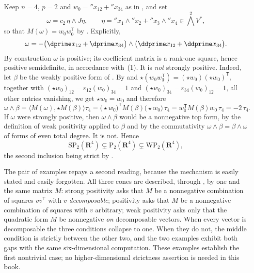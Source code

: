 \begin{example}
\label{ex:ch09-positive-not-strong}
Keep $n=4$, $p=2$ and $w_0=\dprime x_{12}+\dprime x_{34}$ as in
, and set
\[
 \omega=c_2\,\eta\wedge J\eta,
 \qquad
 \eta=\dprime x_1\wedge\dprime x_2+\dprime x_3\wedge\dprime x_4
     \in\bigwedge^2V^*,
\]
so that $M(\omega)=w_0w_0^{\mathsf T}$ by .
Explicitly,
\[
 \omega=-\bigl(\dprime x_{12}+\dprime x_{34}\bigr)
        \wedge\bigl(\ddprime x_{12}+\ddprime x_{34}\bigr).
\]
By construction $\omega$ is positive; its coefficient matrix is a rank-one
square, hence positive semidefinite, in accordance with
\,(1).  It is \emph{not} strongly
positive.  Indeed, let $\beta$ be the weakly positive form of
.  By
 and
$\star(w_0w_0^{\mathsf T})=(\star w_0)(\star w_0)^{\mathsf T}$, together with
$(\star w_0)_{12}=\varepsilon_{12}(w_0)_{34}=1$ and
$(\star w_0)_{34}=\varepsilon_{34}(w_0)_{12}=1$, all other entries vanishing,
we get $\star w_0=w_0$ and therefore
\[
 \omega\wedge\beta
 =\bigl\langle M(\omega),\star M(\beta)\bigr\rangle\tau_4
 =\bigl(\star w_0\bigr)^{\mathsf T}M(\beta)\bigl(\star w_0\bigr)\,\tau_4
 =w_0^{\mathsf T}M(\beta)w_0\,\tau_4=-2\,\tau_4 .
\]
If $\omega$ were strongly positive, then $\omega\wedge\beta$ would be a
nonnegative top form, by the definition of weak positivity applied to
$\beta$ and by the commutativity
$\omega\wedge\beta=\beta\wedge\omega$ of forms of even total degree.  It is
not.  Hence
\[
 \mathrm{SP}_2(\mathbf R^4)\subsetneq\mathrm{P}_2(\mathbf R^4)
 \subsetneq\mathrm{WP}_2(\mathbf R^4),
\]
the second inclusion being strict by .
\end{example}

The pair of examples repays a second reading, because the mechanism is
easily stated and easily forgotten.  All three cones are described, through
, by one and the same matrix $M$:
strong positivity asks that $M$ be a nonnegative combination of squares
$vv^{\mathsf T}$ with $v$ \emph{decomposable}; positivity asks that $M$ be a
nonnegative combination of squares with $v$ arbitrary; weak positivity asks
only that the quadratic form $M$ be nonnegative \emph{on} decomposable
vectors.  When every vector is decomposable the three conditions collapse to
one.  When they do not, the middle condition is strictly between the other
two, and the two examples exhibit both gaps with the same six-dimensional
computation.  These examples establish the first nontrivial case; no
higher-dimensional strictness assertion is needed in this book.

